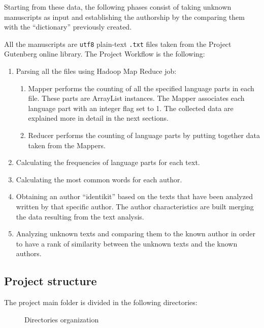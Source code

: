 \documentclass[a4paper,11pt, twoside]{article}
\begin{document}
	\noindent
	Starting from these data, the following phases consist of taking unknown manuscripts as input and establishing the authorship by the comparing them with the ``dictionary'' previously created. 
	
	\noindent
	All the manuscripts are \texttt{utf8} plain-text \texttt{.txt} files taken from the Project Gutenberg \parencite{Gutenberg} online library.
	The Project Workflow is the following:
	\begin{enumerate}
		\item Parsing all the files using Hadoop Map Reduce job: 
		\begin{enumerate}
			\item Mapper performs the counting of all the specified language parts in each file. These parts are ArrayList instances. The Mapper associates each language part with an integer flag set to 1. The collected data are explained more in detail in the next sections. 
			
			\item Reducer performs the counting of language parts by putting together data taken from the Mappers.
		\end{enumerate}
		\item Calculating the frequencies of language parts for each text.
		\item Calculating the most common words for each author.
		\item Obtaining an author ``identikit'' based on the texts that have been analyzed written by that specific author. The author characteristics are built merging the data resulting from the text analysis.
		\item Analyzing unknown texts and comparing them to the known author in order to have a rank of similarity between the unknown texts and the known authors.
	\end{enumerate}

	\subsection{Project structure}
		The project main folder is divided in the following directories:
		\begin{figure}[h!]
			{\small
			}
			\caption{Directories organization}
    		\label{fig:dir-org}
		\end{figure}
\end{document}
